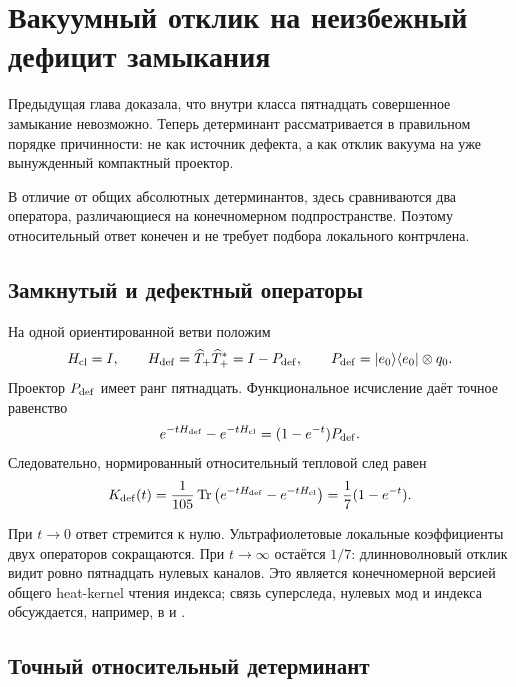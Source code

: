 \chapter{Вакуумный отклик на неизбежный дефицит замыкания}

Предыдущая глава доказала, что внутри класса пятнадцать совершенное
замыкание невозможно. Теперь детерминант рассматривается в правильном
порядке причинности: не как источник дефекта, а как отклик вакуума на уже
вынужденный компактный проектор.

В отличие от общих абсолютных детерминантов, здесь сравниваются два
оператора, различающиеся на конечномерном подпространстве. Поэтому
относительный ответ конечен и не требует подбора локального контрчлена.

\section{Замкнутый и дефектный операторы}

На одной ориентированной ветви положим
\begin{equation}
 H_{\rm cl}=I,
 \qquad
 H_{\rm def}=\widehat T_+\widehat T_+^*=I-P_{\rm def},
 \qquad
 P_{\rm def}=|e_0\rangle\langle e_0|\otimes q_0.
 \label{eq:v5-closed-defect-hamiltonians}
\end{equation}
Проектор $P_{\rm def}$ имеет ранг пятнадцать. Функциональное исчисление
даёт точное равенство
\begin{equation}
 e^{-tH_{\rm def}}-e^{-tH_{\rm cl}}
 =(1-e^{-t})P_{\rm def}.
 \label{eq:v5-finite-rank-heat-response}
\end{equation}
Следовательно, нормированный относительный тепловой след равен
\begin{equation}
 K_{\rm def}(t)
 =\frac1{105}\operatorname{Tr}
 \left(e^{-tH_{\rm def}}-e^{-tH_{\rm cl}}\right)
 =\frac17(1-e^{-t}).
 \label{eq:v5-defect-heat-trace}
\end{equation}

При $t\to0$ ответ стремится к нулю. Ультрафиолетовые локальные коэффициенты
двух операторов сокращаются. При $t\to\infty$ остаётся $1/7$: длинноволновый
отклик видит ровно пятнадцать нулевых каналов. Это является конечномерной
версией общего heat-kernel чтения индекса; связь суперследа, нулевых мод и
индекса обсуждается, например, в  и
.

\section{Точный относительный детерминант}

